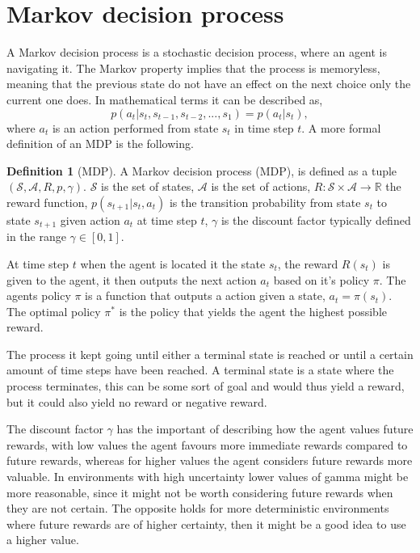 \documentclass[12pt,A4]{report}
\theoremstyle{definition}
\newtheorem{definition}{Definition}[section]
\begin{document}
\section{Markov decision process}
A Markov decision process is a stochastic decision process, where an agent is navigating it. The Markov property implies that the process is memoryless, meaning that the previous state do not have an effect on the next choice only the current one does. In mathematical terms it can be described as,
\[ p(a_t|s_t, s_{t-1}, s_{t-2}, ... , s_1) = p(a_t|s_t),\]
where $a_t$ is an action performed from state $s_t$ in time step $t$. A more formal definition of an MDP is the following.

\begin{definition}[MDP]
    A Markov decision process (MDP), is defined as a tuple $(\mathcal{S}, \mathcal{A}, R, p, \gamma)$. $\mathcal{S}$ is the set of states, $\mathcal{A}$ is the set of actions, $R: \mathcal{S} \times \mathcal{A} \rightarrow \mathbb{R}$ the reward function, $p(s_{t+1}|s_t, a_t)$ is the transition probability from state $s_t$ to state $s_{t+1}$ given action $a_t$ at time step $t$, $\gamma$ is the discount factor typically defined in the range $\gamma \in [0, 1]$.
\end{definition}

At time step $t$ when the agent is located it the state $s_t$, the reward $R(s_t)$ is given to the agent, it then outputs the next action $a_t$ based on it's policy $\pi$. The agents policy $\pi$ is a function that outputs a action given a state, $a_t = \pi(s_t)$. The optimal policy $\pi^*$ is the policy that yields the agent the highest possible reward. 

The process it kept going until either a terminal state is reached or until a certain amount of time steps have been reached. A terminal state is a state where the process terminates, this can be some sort of goal and would thus yield a reward, but it could also yield no reward or negative reward.

The discount factor $\gamma$ has the important of describing how the agent values future rewards, with low values the agent favours more immediate rewards compared to future rewards, whereas for higher values the agent considers future rewards more valuable. In environments with high uncertainty lower values of gamma might be more reasonable, since it might not be worth considering future rewards when they are not certain. The opposite holds for more deterministic environments where future rewards are of higher certainty, then it might be a good idea to use a higher value.
\end{document}
